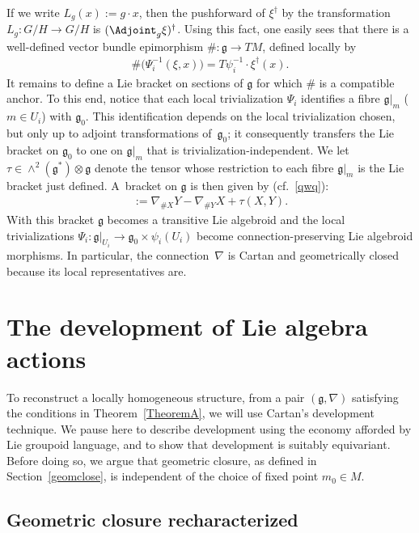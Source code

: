 If we write $L_g(x):=g\cdot x$, then the pushforward of $\xi^\dagger$
by the transformation $L_g \colon G/H \rightarrow G/H$ is $(\Adjoint_g
\xi)^\dagger$. Using this fact, one easily sees that there is a
well-def\/ined vector bundle epimorphism $\# \colon {\mathfrak
  g} \rightarrow TM$, def\/ined locally by
\begin{gather*}
  \#\big(\Psi_i^{-1}(\xi,x)\big)=T \psi_i^{-1}\cdot \xi^\dagger(x).
\end{gather*}
It remains to def\/ine a Lie bracket on sections of $\mathfrak g$ for
which $\#$ is a compatible anchor. To this end, notice that each local
trivialization $\Psi_i$ identif\/ies a f\/ibre ${\mathfrak g}|_m$ ($m\in
U_i$) with ${\mathfrak g}_0$. This identif\/ication depends on the local
trivialization chosen, but only up to adjoint transformations of~${\mathfrak g}_0$; it consequently transfers the Lie bracket on
${\mathfrak g}_0$ to one on ${\mathfrak g}|_m$ that is
trivialization-independent. We let $\tau\in\wedge^2({\mathfrak
  g}^*)\otimes {\mathfrak g}$ denote the tensor whose restriction to
each f\/ibre ${\mathfrak g}|_m$ is the Lie bracket just def\/ined. A~bracket on ${\mathfrak g}$ is then given by
(cf.~\eqref{qwq}):
\begin{gather*}
  [ X, Y]:=\nabla_{\#X}Y-\nabla_{\#Y}X+\tau (X,Y).%
\end{gather*}
With this bracket $\mathfrak g$ becomes a transitive Lie algebroid and
the local trivializations $\Psi_i \colon {\mathfrak g}|_{U_i}
\rightarrow {\mathfrak g}_0 \times \psi_i(U_i)$ become
connection-preserving Lie algebroid morphisms. In particular, the
connec\-tion~$\nabla$ is Cartan and geometrically closed because its
local representatives are.

\section{The development of Lie algebra actions}\label{smoothact}
To reconstruct a locally homogeneous structure, from a pair
$({\mathfrak g},\nabla)$ satisfying the conditions in Theorem~\ref{TheoremA}, we
will use Cartan's development technique. We pause here to describe
development using the economy af\/forded by Lie groupoid language, and
to show that development is suitably equivariant. Before doing so, we
argue that geometric closure, as def\/ined in Section~\ref{geomclose}, is
independent of the choice of f\/ixed point $m_0 \in M$.

\subsection{Geometric closure recharacterized}\label{hudo}

